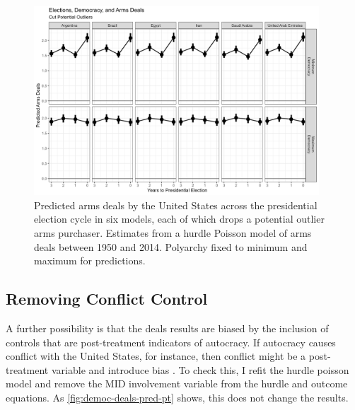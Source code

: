 \documentclass[12pt]{article}
\begin{document}
\begin{figure}[htpb]
	\centering
		\includegraphics[width=0.95\textwidth]{democ-deals-pred-drop.png}
	\caption{Predicted arms deals by the United States across the presidential election cycle in six models, each of which drops a potential outlier arms purchaser. Estimates from a hurdle Poisson model of arms deals between 1950 and 2014. Polyarchy fixed to minimum and maximum for predictions.}
	\label{fig:democ-deals-pred-drop}
\end{figure}


\subsection{Removing Conflict Control}

A further possibility is that the deals results are biased by the inclusion of controls that are post-treatment indicators of autocracy. 
If autocracy causes conflict with the United States, for instance, then conflict might be a post-treatment variable and introduce bias \citep{Montgomeryetal2018}. 
To check this, I refit the hurdle poisson model and remove the MID involvement variable from the hurdle and outcome equations. 
As \autoref{fig:democ-deals-pred-pt} shows, this does not change the results. 
\end{document}

